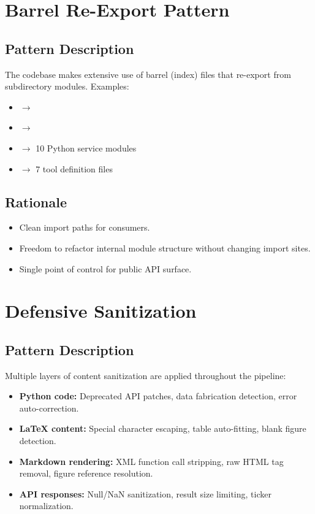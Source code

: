 \section{Barrel Re-Export Pattern}
\label{sec:patterns:barrel}

\subsection{Pattern Description}

The codebase makes extensive use of barrel (index) files that re-export from subdirectory modules.
Examples:
\begin{itemize}
  \item {} $\to$ 
  \item {} $\to$ 
  \item {} $\to$ 10 Python service modules
  \item {} $\to$ 7 tool definition files
\end{itemize}

\subsection{Rationale}

\begin{itemize}
  \item Clean import paths for consumers.
  \item Freedom to refactor internal module structure without changing import sites.
  \item Single point of control for public API surface.
\end{itemize}

\section{Defensive Sanitization}
\label{sec:patterns:sanitization}

\subsection{Pattern Description}

Multiple layers of content sanitization are applied throughout the pipeline:
\begin{itemize}
  \item \textbf{Python code:} Deprecated API patches, data fabrication detection, error auto-correction.
  \item \textbf{LaTeX content:} Special character escaping, table auto-fitting, blank figure detection.
  \item \textbf{Markdown rendering:} XML function call stripping, raw HTML tag removal, figure reference resolution.
  \item \textbf{API responses:} Null/NaN sanitization, result size limiting, ticker normalization.
\end{itemize}

